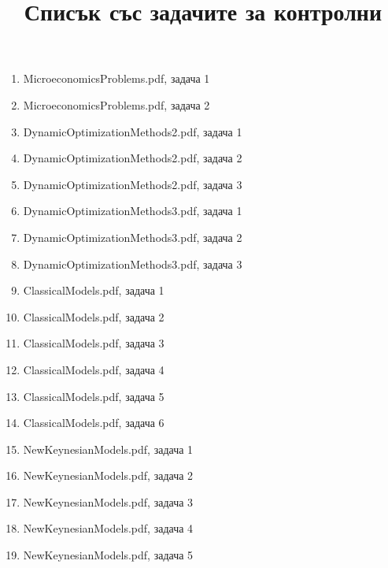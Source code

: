 \documentclass[10pt,a4paper]{article}
\title{Списък със задачите за контролни}
\date{}
\begin{document}
	\maketitle
	\begin{enumerate}
		\item MicroeconomicsProblems.pdf, задача 1
		\item MicroeconomicsProblems.pdf, задача 2
		\item DynamicOptimizationMethods2.pdf, задача 1
		\item DynamicOptimizationMethods2.pdf, задача 2
		\item DynamicOptimizationMethods2.pdf, задача 3
		\item DynamicOptimizationMethods3.pdf, задача 1
		\item DynamicOptimizationMethods3.pdf, задача 2
		\item DynamicOptimizationMethods3.pdf, задача 3
		\item ClassicalModels.pdf, задача 1
		\item ClassicalModels.pdf, задача 2
		\item ClassicalModels.pdf, задача 3
		\item ClassicalModels.pdf, задача 4
		\item ClassicalModels.pdf, задача 5
		\item ClassicalModels.pdf, задача 6
		\item NewKeynesianModels.pdf, задача 1
		\item NewKeynesianModels.pdf, задача 2
		\item NewKeynesianModels.pdf, задача 3
		\item NewKeynesianModels.pdf, задача 4
		\item NewKeynesianModels.pdf, задача 5
	\end{enumerate}
\end{document}
